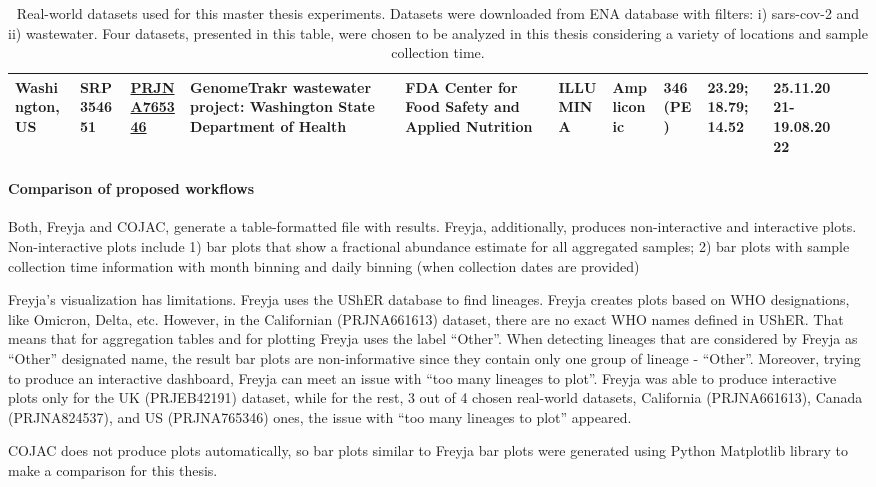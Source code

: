 \begin{landscape}
\begin{table}[ht!]
\begin{tabular}{l|l|l|l|l|l|l|l|l|l|l|l}
                    \multicolumn{1}{m{1.5cm}|}{Washington, US}&SRP354651&\href{https://www.ebi.ac.uk/ena/browser/view/PRJNA765346}{PRJNA765346}&\multicolumn{1}{m{2cm}|}{GenomeTrakr wastewater project: Washington State Department of Health}&\multicolumn{1}{m{2cm}|}{FDA Center for Food Safety and Applied Nutrition}&ILLUMINA&\multicolumn{1}{m{2cm}|}{Ampliconic}&346 (PE)&\multicolumn{1}{m{2cm}|}{23.29; 18.79; 14.52}&\multicolumn{1}{m{2cm}}{25.11.2021-19.08.2022} \\
                    \hline
                \end{tabular}
                \caption{Real-world datasets used for this master thesis experiments. Datasets were downloaded from ENA database \cite{ena} with filters: i) sars-cov-2 and ii) wastewater. Four datasets, presented in this table, were chosen to be analyzed in this thesis considering a variety of locations and sample collection time.} \label{tab:methods:real-datasets}
                \end{table}
                \vfill
            \end{landscape}
            
            \paragraph{Comparison of proposed workflows}
            Both, Freyja and COJAC, generate a table-formatted file with results. Freyja, additionally, produces non-interactive and interactive plots. Non-interactive plots include 1) bar plots that show a fractional abundance estimate for all aggregated samples; 2) bar plots with sample collection time information with month binning and daily binning (when collection dates are provided)

            Freyja’s visualization has limitations. Freyja uses the UShER database to find lineages. Freyja creates plots based on WHO designations, like Omicron, Delta, etc. However, in the Californian (PRJNA661613) dataset, there are no exact WHO names defined in UShER. That means that for aggregation tables and for plotting Freyja uses the label “Other”. When detecting lineages that are considered by Freyja as “Other” designated name, the result bar plots are non-informative since they contain only one group of lineage - “Other”. Moreover, trying to produce an interactive dashboard, Freyja can meet an issue with “too many lineages to plot”. Freyja was able to produce interactive plots only for the UK (PRJEB42191) dataset, while for the rest, 3 out of 4 chosen real-world datasets, California (PRJNA661613), Canada (PRJNA824537), and US (PRJNA765346) ones, the issue with “too many lineages to plot” appeared.
            
            COJAC does not produce plots automatically, so bar plots similar to Freyja bar plots were generated using Python Matplotlib library to make a comparison for this thesis.
